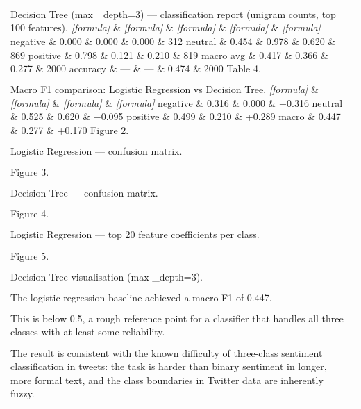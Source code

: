 \documentclass[11pt]{article}
\begin{document}
\begin{longtable}{|p{\dimexpr\linewidth-2\tabcolsep-2\arrayrulewidth\relax}|}
\hline
\rule{0pt}{3.5cm} \\
\hline
Decision Tree (max \_depth=3) --- classification report (unigram counts, top 100 features). \textit{[formula]} \& \textit{[formula]} \& \textit{[formula]} \& \textit{[formula]} \& \textit{[formula]} negative \& 0.000 \& 0.000 \& 0.000 \& 312 neutral \& 0.454 \& 0.978 \& 0.620 \& 869 positive \& 0.798 \& 0.121 \& 0.210 \& 819 macro avg \& 0.417 \& 0.366 \& 0.277 \& 2000 accuracy \& --- \& --- \& 0.474 \& 2000 Table 4. \\[2pt]
\hline
\rule{0pt}{3.5cm} \\
\hline
Macro F1 comparison: Logistic Regression vs Decision Tree. \textit{[formula]} \& \textit{[formula]} \& \textit{[formula]} \& \textit{[formula]} negative \& 0.316 \& 0.000 \& +0.316 neutral \& 0.525 \& 0.620 \& −0.095 positive \& 0.499 \& 0.210 \& +0.289 macro \& 0.447 \& 0.277 \& +0.170 Figure 2. \\[2pt]
\hline
\rule{0pt}{3.5cm} \\
\hline
Logistic Regression --- confusion matrix. \\[2pt]
\hline
\rule{0pt}{3.5cm} \\
\hline
Figure 3. \\[2pt]
\hline
\rule{0pt}{3.5cm} \\
\hline
Decision Tree --- confusion matrix. \\[2pt]
\hline
\rule{0pt}{3.5cm} \\
\hline
Figure 4. \\[2pt]
\hline
\rule{0pt}{3.5cm} \\
\hline
Logistic Regression --- top 20 feature coefficients per class. \\[2pt]
\hline
\rule{0pt}{3.5cm} \\
\hline
Figure 5. \\[2pt]
\hline
\rule{0pt}{3.5cm} \\
\hline
Decision Tree visualisation (max \_depth=3). \\[2pt]
\hline
\rule{0pt}{3.5cm} \\
\hline
The logistic regression baseline achieved a macro F1 of 0.447. \\[2pt]
\hline
\rule{0pt}{3.5cm} \\
\hline
This is below 0.5, a rough reference point for a classifier that handles all three classes with at least some reliability. \\[2pt]
\hline
\rule{0pt}{3.5cm} \\
\hline
The result is consistent with the known difficulty of three-class sentiment classification in tweets: the task is harder than binary sentiment in longer, more formal text, and the class boundaries in Twitter data are inherently fuzzy. \\[2pt]

\end{longtable}
\end{document}
